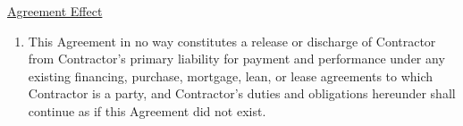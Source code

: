 \underline{Agreement Effect}
\begin{enumerate}[
    ref = \SecondLevelEnumerator
]
    \item This Agreement in no way constitutes a release or discharge of
    Contractor from Contractor's primary liability for payment and
    performance under any existing financing, purchase, mortgage, lean, or
    lease agreements to which Contractor is a party, and Contractor's
    duties and obligations hereunder shall continue as if this Agreement
    did not exist.
\end{enumerate}